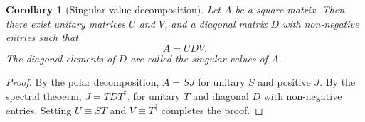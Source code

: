 \documentclass{article}
\numberwithin{theorem}{section}
\newtheorem{corollary}{Corollary}
\numberwithin{corollary}{section}
\begin{document}
\begin{corollary}[Singular value decomposition]
  Let $A$ be a square matrix. Then there exist unitary matrices $U$ and $V$,
  and a diagonal matrix $D$ with non-negative entries such that \[
    A = UDV.
  \] The diagonal elements of $D$ are called the \emph{singular values} of $A$.
\end{corollary}
\begin{proof}
  By the polar decomposition, $A = SJ$ for unitary $S$ and positive $J$. By the
  spectral theoerm, $J = TDT^{\dagger}$, for unitary $T$ and diagonal $D$ with
  non-negative entries. Setting $U \equiv ST$ and $V \equiv T^{\dagger}$
  completes the proof.
\end{proof}
\end{document}
